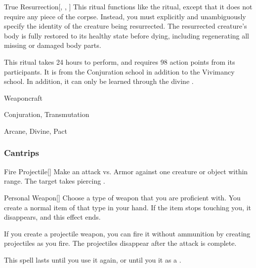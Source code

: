 \lowercase{\hypertarget{spell:True Resurrection}{}}\label{spell:True Resurrection}
\begin{apability}[\nth{7}]{\hypertarget{spell:True Resurrection}{True Resurrection}}[, , ]
This ritual functions like the  ritual, except that it does not require any piece of the corpse.
Instead, you must explicitly and unambiguously specify the identity of the creature being resurrected.
The resurrected creature's body is fully restored to its healthy state before dying, including regenerating all missing or damaged body parts.

This ritual takes 24 hours to perform, and requires 98 action points from its participants.
It is from the Conjuration school in addition to the Vivimancy school.
In addition, it can only be learned through the divine .
\end{apability}
\vspace{0.25em}


\newpage
\begin{spellsection}{Weaponcraft}

\begin{spellheader}
\end{spellheader}


 Conjuration, Transmutation

 Arcane, Divine, Pact

\subsubsection{Cantrips}


\begin{freeability}{Fire Projectile}[]
Make an attack vs. Armor against one creature or object within \rngmed range.
\hit The target takes piercing .
\end{freeability}


\begin{freeability}{Personal Weapon}[]
Choose a type of weapon that you are proficient with.
You create a normal item of that type in your hand.
If the item stops touching you, it disappears, and this effect ends.

If you create a projectile weapon, you can fire it without ammunition by creating projectiles as you fire.
The projectiles disappear after the attack is complete.

This spell lasts until you use it again, or until you  it as a .
\end{freeability}

\end{spellsection}


